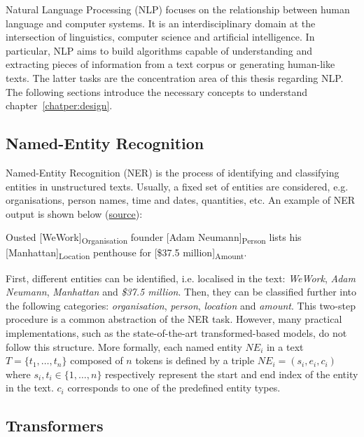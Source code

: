 Natural Language Processing (NLP) focuses on the relationship between human language and computer systems. It is an interdisciplinary domain at the intersection of linguistics, computer science and artificial intelligence. In particular, NLP aims to build algorithms capable of understanding and extracting pieces of information from a text corpus or generating human-like texts. The latter tasks are the concentration area of this thesis regarding NLP. The following sections introduce the necessary concepts to understand chapter~\ref{chatper:design}.

\subsection{Named-Entity Recognition}

Named-Entity Recognition (NER) is the process of identifying and classifying entities in unstructured texts. Usually, a fixed set of entities are considered, e.g. organisations, person names, time and dates, quantities, etc. An example of NER output is shown below (\href{https://tdai.osu.edu/sites/default/files/2022-06/2022-foundations-tutorial3-sunwang-deeplearning4nlp.pdf}{source}):

\begin{center}
    Ousted [WeWork]\textsubscript{Organisation} founder [Adam Neumann]\textsubscript{Person} lists his [Manhattan]\textsubscript{Location} penthouse for [\$37.5 million]\textsubscript{Amount}.
\end{center}

First, different entities can be identified, i.e. localised in the text: \textit{WeWork}, \textit{Adam Neumann}, \textit{Manhattan} and \textit{\$37.5 million}. Then, they can be classified further into the following categories: \textit{organisation}, \textit{person}, \textit{location} and \textit{amount}. This two-step procedure is a common abstraction of the NER task. However, many practical implementations, such as the state-of-the-art transformed-based models, do not follow this structure. More formally, each named entity $NE_i$ in a text $T = \{t_1,\ldots,t_n\}$ composed of $n$ tokens is defined by a triple $NE_i= (s_i, e_i, c_i)$ where $s_i, t_i \in \{1, \ldots, n\}$ respectively represent the start and end index of the entity in the text. $c_i$ corresponds to one of the predefined entity types. %

\subsection{Transformers}

